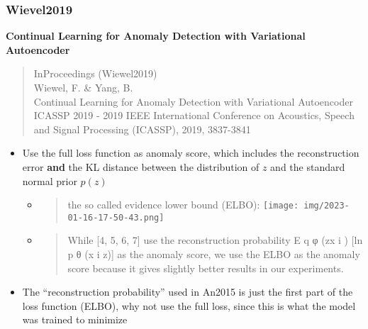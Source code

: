 \documentclass[
  letterpaper,
  DIV=11,
  numbers=noendperiod]{scrartcl}
\begin{document}
\hypertarget{wievel2019}{%
\subsubsection{Wievel2019}\label{wievel2019}}

\textbf{Continual Learning for Anomaly Detection with Variational
Autoencoder}

\begin{quote}
InProceedings (Wiewel2019)\\
Wiewel, F. \& Yang, B.\\
Continual Learning for Anomaly Detection with Variational Autoencoder\\
ICASSP 2019 - 2019 IEEE International Conference on Acoustics, Speech
and Signal Processing (ICASSP), 2019, 3837-3841
\end{quote}

\begin{itemize}
\item
  Use the full loss function as anomaly score, which includes the
  reconstruction error \textbf{and} the KL distance between the
  distribution of \(z\) and the standard normal prior \(p(z)\)

  \begin{itemize}
  \item
    \begin{quote}
    the so called evidence lower bound (ELBO):
    \texttt{[image: img/2023-01-16-17-50-43.png]}
    \end{quote}
  \item
    \begin{quote}
    While {[}4, 5, 6, 7{]} use the reconstruction probability E q φ
    (z\textbar x i ) {[}ln p θ (x i \textbar z){]} as the anomaly score,
    we use the ELBO as the anomaly score because it gives slightly
    better results in our experiments.
    \end{quote}
  \end{itemize}
\item
  The ``reconstruction probability'' used in An2015 is just the first
  part of the loss function (ELBO), why not use the full loss, since
  this is what the model was trained to minimize
\end{itemize}
\end{document}
